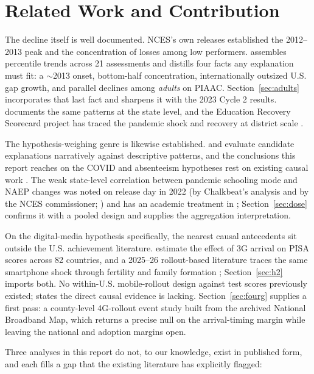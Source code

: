 \documentclass[11pt]{article}
\begin{document}
\section{Related Work and Contribution}
\label{sec:related}

The decline itself is well documented. NCES's own releases established the 2012--2013 peak and the concentration of losses among low performers. \citet{malkus2025theories} assembles percentile trends across 21 assessments and distills four facts any explanation must fit: a $\sim$2013 onset, bottom-half concentration, internationally outsized U.S. gap growth, and parallel declines among \emph{adults} on PIAAC. Section~\ref{sec:adults} incorporates that last fact and sharpens it with the 2023 Cycle 2 results. \citet{wyckoff2025} documents the same patterns at the state level, and the Education Recovery Scorecard project has traced the pandemic shock and recovery at district scale \citep{kane2024,kane2025,dewey2026}.

The hypothesis-weighing genre is likewise established. \citet{malkus2025theories} and \citet{wyckoff2025} evaluate candidate explanations narratively against descriptive patterns, and the conclusions this report reaches on the COVID and absenteeism hypotheses rest on existing causal work \citep{goldhaber2023,jack2023,cea2023,dee2024}. The weak state-level correlation between pandemic schooling mode and NAEP changes was noted on release day in 2022 (by Chalkbeat's analysis and by the NCES commissioner; \citealp{barnum2022}) and has an academic treatment in \citet{lsae2025}; Section~\ref{sec:dose} confirms it with a pooled design and supplies the aggregation interpretation.

On the digital-media hypothesis specifically, the nearest causal antecedents sit outside the U.S. achievement literature. \citet{jainstemper2024} estimate the effect of 3G arrival on PISA scores across 82 countries, and a 2025--26 rollout-based literature traces the same smartphone shock through fertility and family formation \citep{myershooper2026,hudsonmoscoso2026}; Section~\ref{sec:h2} imports both. No within-U.S. mobile-rollout design against test scores previously existed; \citet{wyckoff2025} states the direct causal evidence is lacking. Section~\ref{sec:fourg} supplies a first pass: a county-level 4G-rollout event study built from the archived National Broadband Map, which returns a precise null on the arrival-timing margin while leaving the national and adoption margins open.

Three analyses in this report do not, to our knowledge, exist in published form, and each fills a gap that the existing literature has explicitly flagged:
\end{document}
